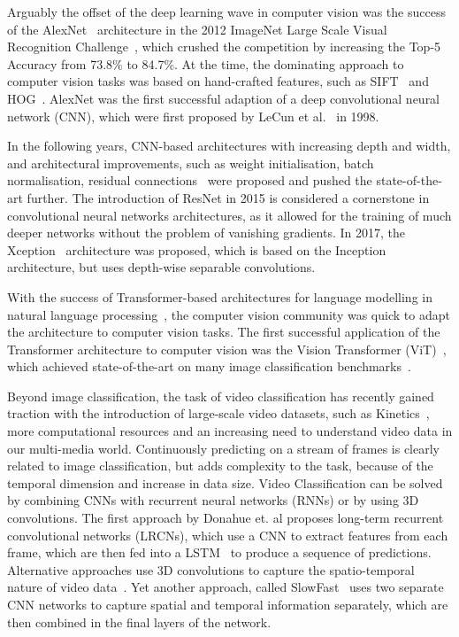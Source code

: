 \documentclass[a4paper]{article}
\begin{document}
  Arguably the offset of the deep learning wave in computer vision was the
  success of the AlexNet~\cite{alexnet} architecture in the 2012 ImageNet Large
  Scale Visual Recognition Challenge~\cite{imagenet}, which crushed the
  competition by increasing the Top-5 Accuracy from 73.8\% to 84.7\%. At the
  time, the dominating approach to computer vision tasks was based on
  hand-crafted features, such as SIFT~\cite{sift} and HOG~\cite{hog}. AlexNet
  was the first successful adaption of a deep convolutional neural network
  (CNN), which were first proposed by LeCun et al.~\cite{lenet} in 1998. 

  In the following years, CNN-based architectures with increasing depth and
  width, and architectural improvements, such as weight initialisation, batch
  normalisation, residual connections~\cite{vgg, google-lenet, resnet, xception} were
  proposed and pushed the state-of-the-art further. The introduction of ResNet
  in 2015 is considered a cornerstone in convolutional neural networks
  architectures, as it allowed for the training of much deeper networks without
  the problem of vanishing gradients. In 2017, the Xception~\cite{xception}
  architecture was proposed, which is based on the Inception architecture, but
  uses depth-wise separable convolutions.

  With the success of Transformer-based architectures for language modelling in
  natural language processing~\cite{transformer}, the computer vision community
  was quick to adapt the architecture to computer vision tasks. The first
  successful application of the Transformer architecture to computer vision was
  the Vision Transformer (ViT)~\cite{vit}, which achieved state-of-the-art on
  many image classification benchmarks~\cite{cifar-10, cifar-100, imagenet}.

  Beyond image classification, the task of video classification has recently
  gained traction with the introduction of large-scale video datasets, such as
  Kinetics~\cite{kinetics}, more computational resources and an increasing need
  to understand video data in our multi-media world. Continuously predicting on
  a stream of frames is clearly related to image classification, but adds
  complexity to the task, because of the temporal dimension and increase in data
  size. Video Classification can be solved by combining CNNs with recurrent
  neural networks (RNNs) or by using 3D convolutions. The first approach by
  Donahue et. al proposes long-term recurrent convolutional networks (LRCNs),
  which use a CNN to extract features from each frame, which are then fed into a
  LSTM~\cite{lrcn} to produce a sequence of predictions. Alternative approaches
  use 3D convolutions to capture the spatio-temporal nature of video
  data~\cite{c3d, i3d}. Yet another approach, called SlowFast~\cite{slowfast}
  uses two separate CNN networks to capture spatial and temporal information
  separately, which are then combined in the final layers of the network.
\end{document}
